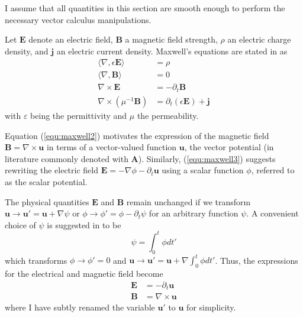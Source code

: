 \documentclass[11pt, a4paper]{article}
\begin{document}
I assume that all quantities in this section are smooth enough to perform the
necessary vector calculus manipulations.

Let $\mathbf{E}$ denote an electric field, $\mathbf{B}$ a magnetic field
strength, $\rho$ an electric charge density, and $\mathbf{j}$ an electric
current density. Maxwell's equations are stated in \citep{monk} as
\begin{align}
    \langle \nabla, \epsilon \mathbf{E} \rangle &= \rho \label{equ:maxwell1} \\
    \langle \nabla, \mathbf{B} \rangle &= 0 \label{equ:maxwell2} \\
    \nabla \times \mathbf{E} &= -\partial_t \mathbf{B} \label{equ:maxwell3} \\
    \nabla \times (\mu^{-1} \mathbf{B}) &= \partial_t (\epsilon \mathbf{E}) + \mathbf{j} \label{equ:maxwell4}
\end{align}
with $\varepsilon$ being the permittivity and $\mu$ the permeability.

Equation (\ref{equ:maxwell2}) motivates the expression of the magnetic field 
$\mathbf{B} = \nabla \times \mathbf{u}$ in terms of a vector-valued function
$\mathbf{u}$, the vector potential (in literature commonly denoted with
$\mathbf{A}$). Similarly, (\ref{equ:maxwell3}) suggests
rewriting the electric field $\mathbf{E} = - \nabla \phi - \partial_t \mathbf{u}$
using a scalar function $\phi$, referred to as the scalar potential.

The physical quantities $\mathbf{E}$ and $\mathbf{B}$ remain unchanged 
if we transform $\mathbf{u} \to \mathbf{u}' = \mathbf{u} + \nabla \psi$ or
$\phi \to \phi' = \phi - \partial_t \psi$ for an arbitrary function $\psi$.
A convenient choice of $\psi$ is suggested in \citep{gauge-transformation} to be
\begin{equation}
    \psi = \int_0^t \phi dt' \label{equ:gauge}
\end{equation}
which transforms $\phi \to \phi' = 0$ and $\mathbf{u} \to \mathbf{u}' = \mathbf{u}
+ \nabla \int_0^t \phi dt'$. Thus, the expressions for the electrical and
magnetic field become
\begin{align}
    \mathbf{E} &= -\partial_t \mathbf{u} \label{equ:electricfield} \\
    \mathbf{B} &= \nabla \times \mathbf{u} \label{equ:magneticfield}
\end{align}
where I have subtly renamed the variable $\mathbf{u}'$ to $\mathbf{u}$ for simplicity.
\end{document}
